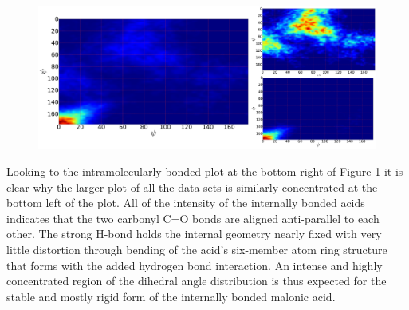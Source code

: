 \begin{figure}[h!]
	\begin{center}
		\includegraphics[scale=1.0]{images/orientation/psi-psi.png}
		\caption{}
		\label{fig:psi-psi}
	\end{center}
\end{figure}

Looking to the intramolecularly bonded plot at the bottom right of Figure \ref{fig:psi-psi} it is clear why the larger plot of all the data sets is similarly concentrated at the bottom left of the plot. All of the intensity of the internally bonded acids indicates that the two carbonyl C=O bonds are aligned anti-parallel to each other. The strong H-bond holds the internal geometry nearly fixed with very little distortion through bending of the acid's six-member atom ring structure that forms with the added hydrogen bond interaction. An intense and highly concentrated region of the dihedral angle distribution is thus expected for the stable and mostly rigid form of the internally bonded malonic acid.


